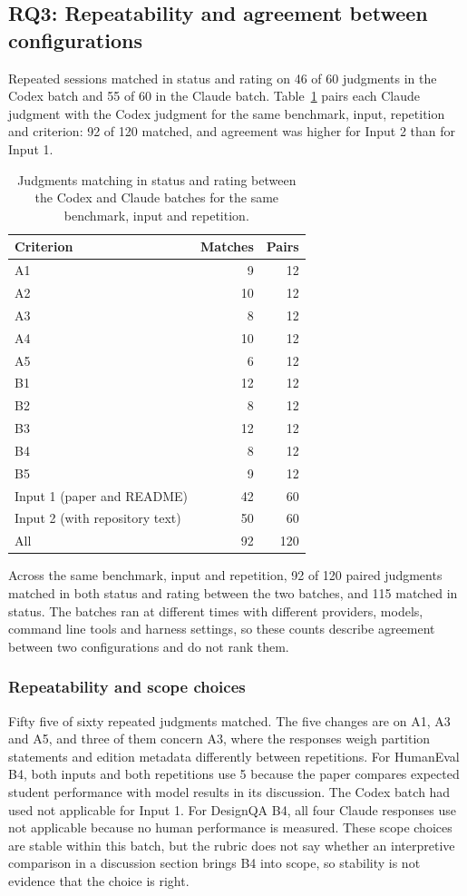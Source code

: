 \documentclass[10pt,conference]{IEEEtran}
\begin{document}
\subsection{RQ3: Repeatability and agreement between configurations}
Repeated sessions matched in status and rating on 46 of 60 judgments in the Codex batch and 55 of 60 in the Claude batch. Table~\ref{tab:cross-batch} pairs each Claude judgment with the Codex judgment for the same benchmark, input, repetition and criterion: 92 of 120 matched, and agreement was higher for Input 2 than for Input 1.
\begin{table}[t]
\caption{Judgments matching in status and rating between the Codex and Claude batches for the same benchmark, input and repetition.}
\label{tab:cross-batch}
\centering\begin{tabular}{lrr}\toprule
Criterion & Matches & Pairs \\
\midrule
A1 & 9 & 12 \\
A2 & 10 & 12 \\
A3 & 8 & 12 \\
A4 & 10 & 12 \\
A5 & 6 & 12 \\
B1 & 12 & 12 \\
B2 & 8 & 12 \\
B3 & 12 & 12 \\
B4 & 8 & 12 \\
B5 & 9 & 12 \\
\midrule
Input 1 (paper and README) & 42 & 60 \\
Input 2 (with repository text) & 50 & 60 \\
All & 92 & 120 \\
\bottomrule\end{tabular}
\end{table}
Across the same benchmark, input and repetition, 92 of 120 paired judgments matched in both status and rating between the two batches, and 115 matched in status. The batches ran at different times with different providers, models, command line tools and harness settings, so these counts describe agreement between two configurations and do not rank them.
\subsubsection{Repeatability and scope choices}
Fifty five of sixty repeated judgments matched. The five changes are on A1, A3 and A5, and three of them concern A3, where the responses weigh partition statements and edition metadata differently between repetitions. For HumanEval B4, both inputs and both repetitions use 5 because the paper compares expected student performance with model results in its discussion. The Codex batch had used not applicable for Input 1. For DesignQA B4, all four Claude responses use not applicable because no human performance is measured. These scope choices are stable within this batch, but the rubric does not say whether an interpretive comparison in a discussion section brings B4 into scope, so stability is not evidence that the choice is right.
\end{document}
